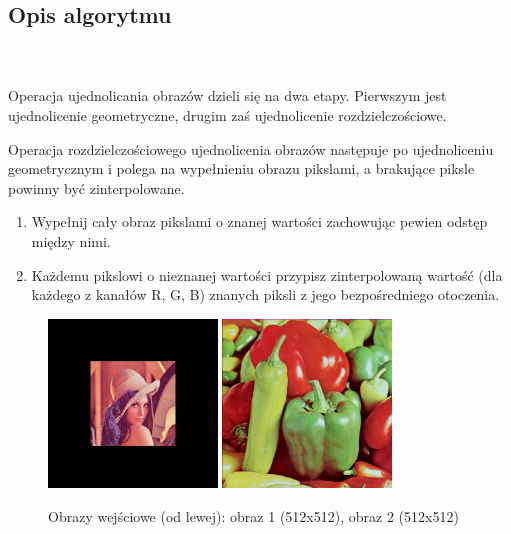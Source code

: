 \documentclass[final,a4paper,openany,12pt]{mwbk}
\begin{document}
\subsection*{Opis algorytmu}
\hfill
\\\\
\indent 
Operacja ujednolicania obrazów dzieli się na dwa etapy. Pierwszym jest ujednolicenie geometryczne, drugim zaś ujednolicenie rozdzielczościowe.

Operacja rozdzielczościowego ujednolicenia obrazów następuje po ujednoliceniu geometrycznym i polega na wypełnieniu obrazu pikslami, a brakujące piksle powinny być zinterpolowane.
\begin{enumerate}
	\item Wypełnij cały obraz pikslami o znanej wartości zachowując pewien odstęp między nimi.
	\item Każdemu pikslowi o nieznanej wartości przypisz zinterpolowaną wartość (dla każdego z kanałów R, G, B) znanych piksli z jego bezpośredniego otoczenia.
\end{enumerate}

\begin{figure}[H]
	\begin{center}
		\includegraphics[width=0.4\textwidth]{lena_color_unificationGeo_result}
		\includegraphics[width=0.4\textwidth]{peppers_color_unificationGeo_result}
	\end{center}
	\caption{Obrazy wejściowe (od lewej): obraz 1 (512x512), obraz 2 (512x512)}
\end{figure}
\end{document}
